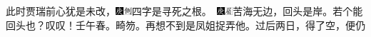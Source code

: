 此时贾瑞前心犹是未改，{\includegraphics[width=3mm]{../Images/00004}\includegraphics[width=3mm]{../Images/00011}\footnotesize \kaishu 四字是寻死之根。　\includegraphics[width=3mm]{../Images/00004}\includegraphics[width=3mm]{../Images/00010}\footnotesize \kaishu 苦海无边，回头是岸。若个能回头也？叹叹！壬午春。畸笏。}再想不到是凤姐捉弄他。过后两日，得了空，便仍